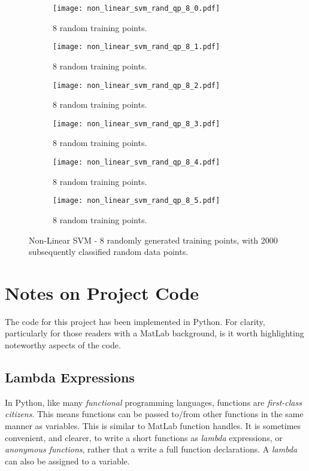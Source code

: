 \documentclass[10pt, a4paper,reqno]{amsart}
\begin{document}
\begin{figure}[H]
	\centering	
	\begin{subfigure}{0.5\textwidth}
		\centering
		\texttt{[image: non\_linear\_svm\_rand\_qp\_8\_0.pdf]}
		\caption{8 random training points.}
	\end{subfigure}%
	\begin{subfigure}{0.5\textwidth}
		\centering
		\texttt{[image: non\_linear\_svm\_rand\_qp\_8\_1.pdf]}
		\caption{8 random training points.}
	\end{subfigure}
	\begin{subfigure}{0.5\textwidth}
		\centering
		\texttt{[image: non\_linear\_svm\_rand\_qp\_8\_2.pdf]}
		\caption{8 random training points.}
	\end{subfigure}%
	\begin{subfigure}{0.5\textwidth}
		\centering
		\texttt{[image: non\_linear\_svm\_rand\_qp\_8\_3.pdf]}
		\caption{8 random training points.}
	\end{subfigure}
	\begin{subfigure}{0.5\textwidth}
		\centering
		\texttt{[image: non\_linear\_svm\_rand\_qp\_8\_4.pdf]}
		\caption{8 random training points.}
	\end{subfigure}%
	\begin{subfigure}{0.5\textwidth}
		\centering
		\texttt{[image: non\_linear\_svm\_rand\_qp\_8\_5.pdf]}
		\caption{8 random training points.}
	\end{subfigure}
	\caption{Non-Linear SVM - 8 randomly generated training points, with 2000 subsequently classified random data points.}
\end{figure}


%
%
\clearpage\section{Notes on Project Code}

The code for this project has been implemented in Python. For clarity, particularly for those readers with a MatLab background, is it worth highlighting noteworthy aspects of the code.

\subsection{Lambda Expressions}
In Python, like many \emph{functional} programming languages, functions are \emph{first-class citizens}. This means functions can be passed to/from other functions in the same manner as variables. This is similar to MatLab function handles. It is sometimes convenient, and clearer, to write a short functions as \emph{lambda} expressions, or \emph{anonymous functions}, rather that a write a full function declarations. A \emph{lambda} can also be assigned to a variable.
\end{document}
